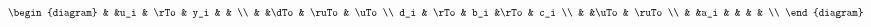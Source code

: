 \documentclass[12pt,a4paper]{article}
\begin{document}
\thispagestyle{empty}

\[
\begin{diagram}
& &u_i  &   \rTo       & y_i     &       &    \\
& &\dTo &  \ruTo & \uTo    \\
d_i & \rTo& b_i &\rTo  & c_i  \\
& &\uTo &  \ruTo      \\
& &a_i  &          &     &       &    \\
\end{diagram}
\]
\end{document}
